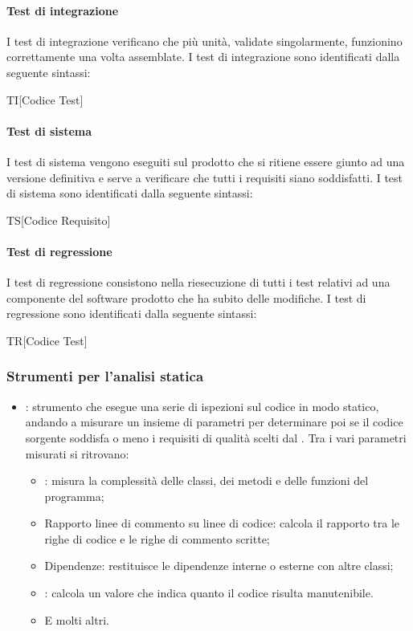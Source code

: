\paragraph{Test di integrazione}
I test di integrazione verificano che più unità, validate singolarmente, funzionino
correttamente una volta assemblate. I test di integrazione sono identificati dalla seguente sintassi:
\begin{center}
  TI[Codice Test]
\end{center}

\paragraph{Test di sistema}
I test di sistema vengono eseguiti sul prodotto che si ritiene essere giunto ad
una versione definitiva e serve a verificare che tutti i requisiti siano soddisfatti. I test di sistema sono identificati dalla seguente sintassi:
\begin{center}
  TS[Codice Requisito]
\end{center}

\paragraph{Test di regressione}
I test di regressione consistono nella riesecuzione di tutti i test relativi ad una
componente del software prodotto che ha subito delle modifiche. I test di regressione sono identificati dalla seguente sintassi:
\begin{center}
  TR[Codice Test]
\end{center}


\subsubsection{Strumenti per l'analisi statica}
\begin{itemize}
  \item \textbf{}: strumento che esegue una serie di ispezioni sul codice in modo statico, andando a misurare un insieme di parametri per determinare poi se il codice sorgente soddisfa o meno i requisiti di qualità scelti dal . Tra i vari parametri misurati si ritrovano:
  \begin{itemize}
    \item \textbf{}: misura la complessità delle classi, dei metodi e delle funzioni del programma;
    \item Rapporto linee di commento su linee di codice: calcola il rapporto tra
    le righe di codice e le righe di commento scritte;
    \item Dipendenze: restituisce le dipendenze interne o esterne con altre
    classi;
    \item \textbf{}: calcola un valore che indica quanto il
    codice risulta manutenibile.
    \item E molti altri.
  \end{itemize}
\end{itemize}

